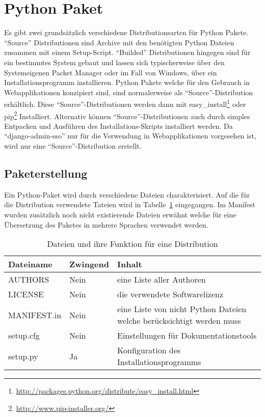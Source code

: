 \section{Python Paket}
\label{sec:Python Paket}
Es gibt zwei grundsätzlich verschiedene Distributionsarten für Python Pakete. ``Source'' Distributionen sind Archive mit den benötigten Python Dateien zusammen mit einem Setup-Script. ``Builded'' Distributionen hingegen sind für ein bestimmtes System gebaut und lassen sich typischerweise über den Systemeigenen Packet Manager oder im Fall von Windows, über ein Installationsprogramm installieren. Python Pakete welche für den Gebrauch in Webapplikationen konzipiert sind, sind normalerweise als ``Source''-Distribution erhältlich. Diese ``Source''-Distributionen werden dann mit easy\_install\footnote{\url{http://packages.python.org/distribute/easy_install.html}} oder pip\footnote{\url{http://www.pip-installer.org/}} Installiert. Alternativ können ``Source''-Distributionen auch durch simples Entpacken und Ausführen des Installations-Skripts installiert werden. Da ``django-admin-sso'' nur für die Verwendung in Webapplikationen vorgesehen ist, wird nur eine ``Source''-Distribution erstellt.

\subsection{Paketerstellung}
\label{sub:paketerstellung}
Ein Python-Paket wird durch verschiedene Dateien charakterisiert. Auf die für die Distribution verwendete Tateien wird in Tabelle~\ref{tab:paket_inhalt} eingegangen. Im Manifest wurden zusätzlich noch nicht existierende Dateien erwähnt welche für eine Übersetzung des Paketes in mehrere Sprachen verwendet werden.

\begin{table}[h]
  \centering
  \begin{tabular}{|l|l|p{7cm}|}
  \hline
  Dateiname & Zwingend & Inhalt\\
  \hline
  AUTHORS & Nein & eine Liste aller Authoren\\
  \hline
  LICENSE & Nein & die verwendete Softwarelizenz\\
  \hline
  MANIFEST.in & Nein & eine Liste von nicht Python Dateien welche berücksichtigt werden muss\\
  \hline
  setup.cfg & Nein & Einstellungen für Dokumentationstools\\
  \hline
  setup.py & Ja & Konfiguration des Installationsprogramms\\
  \hline
  \end{tabular}
  \label{tab:paket_inhalt}
  \caption{Dateien und ihre Funktion für eine Distribution}
\end{table}

